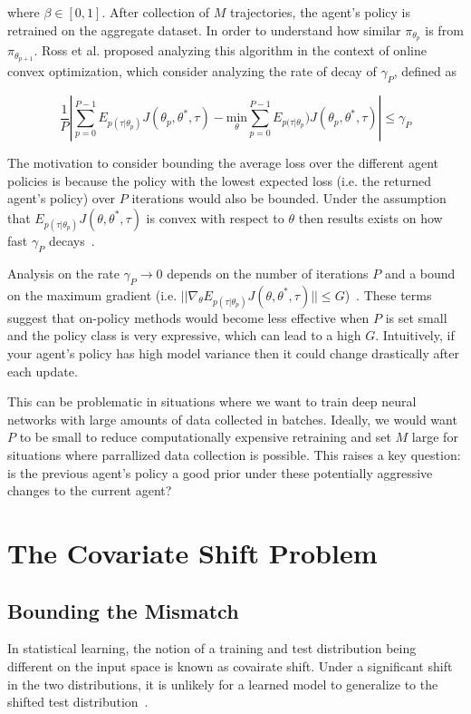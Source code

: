 \documentclass[conference]{article}
\begin{document}
where $\beta \in [0,1]$. After collection of $M$ trajectories, the agent's policy is retrained on the aggregate dataset.  In order to understand how similar $\pi_{\theta_p}$ is from $\pi_{\theta_{p+1}}$. Ross et al. proposed analyzing this algorithm in the context of online convex optimization, which consider analyzing the rate of decay of $\gamma_P$, defined as

$$\frac{1}{P} | \sum^{P-1}_{p=0} E_{p(\tau|\theta_{p})} J(\theta_p,\theta^*,\tau) - \underset{\theta}{\mbox{min}} \sum^{P-1}_{p=0} E_{p(\tau|\theta_p}) J(\theta_p,\theta^*,\tau)| \leq \gamma_P $$

The motivation to consider bounding the average loss over the different agent policies is because the policy with the lowest expected loss (i.e. the returned agent's policy) over $P$ iterations would also be bounded. Under the assumption that $E_{p(\tau|\theta_p)} J(\theta,\theta^*,\tau)$ is convex with respect to $\theta$ then results exists on how fast $\gamma_P$ decays~\cite{shalev2011online}. 

Analysis  on the rate $\gamma_P \rightarrow 0$  depends on the number of iterations $P$ and a bound on the maximum gradient (i.e. $||\nabla_\theta E_{p(\tau|\theta_p)} J(\theta,\theta^*,\tau)||\leq G$)~\cite{lrgc}. These terms suggest that on-policy methods would become less effective when $P$ is set small and the policy class is very expressive, which can lead to a high $G$. Intuitively,  if your agent's policy has high model variance then it could change drastically after each update. 

This can be problematic in situations where we want to train deep neural networks with large amounts of data collected in batches. Ideally, we would want $P$ to be small to reduce computationally expensive retraining and set $M$ large for situations where parrallized data collection is possible. This raises a key question: is the previous agent's policy a good prior under these potentially aggressive changes to the current agent?


\section{The Covariate Shift Problem}\label{sec:dist_mistmatch}


\subsection{Bounding the Mismatch}
In statistical learning, the notion of a training and test distribution being different on the input space is known as covairate shift. Under a significant shift in the two distributions, it is unlikely for a learned model to generalize to the shifted test distribution~\cite{quionero2009dataset}. 
\end{document}
